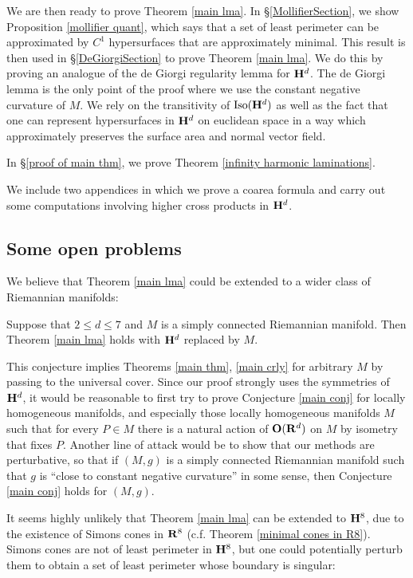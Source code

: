 We are then ready to prove Theorem \ref{main lma}.
In \S\ref{MollifierSection}, we show Proposition \ref{mollifier quant}, which says that a set of least perimeter can be approximated by $C^1$ hypersurfaces that are approximately minimal.
This result is then used in \S\ref{DeGiorgiSection} to prove Theorem \ref{main lma}. We do this by proving an analogue of the de Giorgi regularity lemma \cite[Teorema 5.7]{Miranda66} for $\mathbf H^d$. The de Giorgi lemma is the only point of the proof where we use the constant negative curvature of $M$.
We rely on the transitivity of $\operatorname{Iso}(\mathbf H^d)$ as well as the fact that one can represent hypersurfaces in $\mathbf H^d$ on euclidean space in a way which approximately preserves the surface area and normal vector field.

In \S\ref{proof of main thm}, we prove Theorem \ref{infinity harmonic laminations}.

We include two appendices in which we prove a coarea formula and carry out some computations involving higher cross products in $\mathbf H^d$.


\subsection{Some open problems}
We believe that Theorem \ref{main lma} could be extended to a wider class of Riemannian manifolds:

\begin{conjecture}\label{main conj}
Suppose that $2 \leq d \leq 7$ and $M$ is a simply connected Riemannian manifold. Then Theorem \ref{main lma} holds with $\mathbf H^d$ replaced by $M$.
\end{conjecture}

This conjecture implies Theorems \ref{main thm}, \ref{main crly} for arbitrary $M$ by passing to the universal cover.
Since our proof strongly uses the symmetries of $\mathbf H^d$, it would be reasonable to first try to prove Conjecture \ref{main conj} for locally homogeneous manifolds, and especially those locally homogeneous manifolds $M$ such that for every $P \in M$ there is a natural action of $\mathbf{O}(\mathbf{R}^d)$ on $M$ by isometry that fixes $P$.
Another line of attack would be to show that our methods are perturbative, so that if $(M, g)$ is a simply connected Riemannian manifold such that $g$ is ``close to constant negative curvature'' in some sense, then Conjecture \ref{main conj} holds for $(M, g)$.

It seems highly unlikely that Theorem \ref{main lma} can be extended to $\mathbf H^8$, due to the existence of Simons cones in $\mathbf{R}^8$ (c.f. Theorem \ref{minimal cones in R8}).
Simons cones are not of least perimeter in $\mathbf H^8$, but one could potentially perturb them to obtain a set of least perimeter whose boundary is singular:

